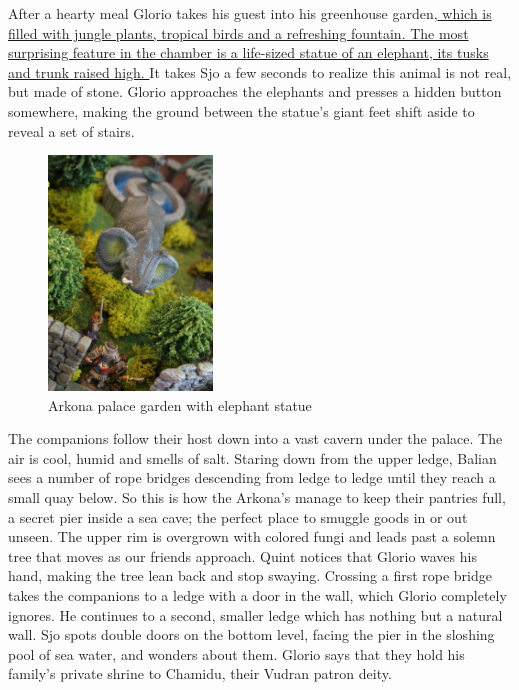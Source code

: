 After a hearty meal Glorio takes his guest into his greenhouse garden,\hyperref[fig:Arkona-palace-garden-with-elephant-statue-563929835]{ which is filled with jungle plants, tropical birds and a refreshing fountain. The most surprising feature in the chamber is a life-sized statue of an elephant, its tusks and trunk raised high. } It takes Sjo a few seconds to realize this animal is not real, but made of stone. Glorio approaches the elephants and presses a hidden button somewhere, making the ground between the statue's giant feet shift aside to reveal a set of stairs. \\

\begin{figure}[h]
	\centering
	\includegraphics[width=0.39\textwidth]{images/Arkona-palace-garden-with-elephant-statue-563929835.jpg}
	\caption{Arkona palace garden with elephant statue}
	\label{fig:Arkona-palace-garden-with-elephant-statue-563929835}
\end{figure}

The companions follow their host down into a vast cavern under the palace. The air is cool, humid and smells of salt. Staring down from the upper ledge, Balian sees a number of rope bridges descending from ledge to ledge until they reach a small quay below. So this is how the Arkona's manage to keep their pantries full, a secret pier inside a sea cave; the perfect place to smuggle goods in or out unseen. The upper rim is overgrown with colored fungi and leads past a solemn tree that moves as our friends approach. Quint notices that Glorio waves his hand, making the tree lean back and stop swaying. Crossing a first rope bridge takes the companions to a ledge with a door in the wall, which Glorio completely ignores. He continues to a second, smaller ledge which has nothing but a natural wall. Sjo spots double doors on the bottom level, facing the pier in the sloshing pool of sea water, and wonders about them. Glorio says that they hold his family's private shrine to Chamidu, their Vudran patron deity.\\

